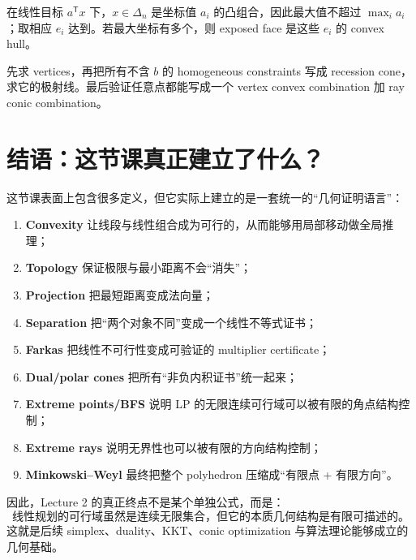 \documentclass[11pt,a4paper,openany]{ctexrep}
\theoremstyle{definition}
\newcommand{\transpose}{\mathsf{T}}
\begin{document}
\begin{exercisebox}
在线性目标 $a^\transpose x$ 下，$x\in\Delta_n$ 是坐标值 $a_i$ 的凸组合，因此最大值不超过 $\max_i a_i$；取相应 $e_i$ 达到。若最大坐标有多个，则 exposed face 是这些 $e_i$ 的 convex hull。
\end{exercisebox}

\begin{exercisebox}
先求 vertices，再把所有不含 $b$ 的 homogeneous constraints 写成 recession cone，求它的极射线。最后验证任意点都能写成一个 vertex convex combination 加 ray conic combination。
\end{exercisebox}

\chapter*{结语：这节课真正建立了什么？}

这节课表面上包含很多定义，但它实际上建立的是一套统一的“几何证明语言”：

\begin{enumerate}[leftmargin=2.3em]
  \item \textbf{Convexity} 让线段与线性组合成为可行的，从而能够用局部移动做全局推理；
  \item \textbf{Topology} 保证极限与最小距离不会“消失”；
  \item \textbf{Projection} 把最短距离变成法向量；
  \item \textbf{Separation} 把“两个对象不同”变成一个线性不等式证书；
  \item \textbf{Farkas} 把线性不可行性变成可验证的 multiplier certificate；
  \item \textbf{Dual/polar cones} 把所有“非负内积证书”统一起来；
  \item \textbf{Extreme points/BFS} 说明 LP 的无限连续可行域可以被有限的角点结构控制；
  \item \textbf{Extreme rays} 说明无界性也可以被有限的方向结构控制；
  \item \textbf{Minkowski--Weyl} 最终把整个 polyhedron 压缩成“有限点 + 有限方向”。
\end{enumerate}

因此，Lecture 2 的真正终点不是某个单独公式，而是：
\[
\boxed{
\text{线性规划的可行域虽然是连续无限集合，}
\text{但它的本质几何结构是有限可描述的。}
}
\]
这就是后续 simplex、duality、KKT、conic optimization 与算法理论能够成立的几何基础。
\end{document}
